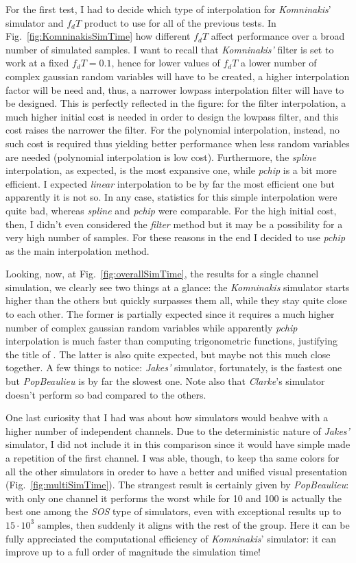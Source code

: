 For the first test, I had to decide which type of interpolation for \textit{Komninakis}' simulator and $f_dT$ product to use for all of the previous tests. In Fig.~\ref{fig:KomninakisSimTime} how different $f_dT$ affect performance over a broad number of simulated samples. I want to recall that \textit{Komninakis'} filter is set to work at a fixed $f_dT=0.1$, hence for lower values of $f_dT$ a lower number of complex gaussian random variables will have to be created, a higher interpolation factor will be need and, thus, a narrower lowpass interpolation filter will have to be designed. This is perfectly reflected in the figure: for the filter interpolation, a much higher initial cost is needed in order to design the lowpass filter, and this cost raises the narrower the filter. For the polynomial interpolation, instead, no such cost is required thus yielding better performance when less random variables are needed (polynomial interpolation is low cost). Furthermore, the \textit{spline} interpolation, as expected, is the most expansive one, while \textit{pchip} is a bit more efficient. I expected \textit{linear} interpolation to be by far the most efficient one but apparently it is not so. In any case, statistics for this simple interpolation were quite bad, whereas \textit{spline} and \textit{pchip} were comparable. For the high initial cost, then, I didn't even considered the \textit{filter} method but it may be a possibility for a very high number of samples. For these reasons in the end I decided to use \textit{pchip} as the main interpolation method.

Looking, now, at Fig.~\ref{fig:overallSimTime}, the results for a single channel simulation, we clearly see two things at a glance: the \textit{Komninakis} simulator starts higher than the others but quickly surpasses them all, while they stay quite close to each other. The former is partially expected since it requires a much higher number of complex gaussian random variables while apparently \textit{pchip} interpolation is much faster than computing trigonometric functions, justifying the title of \cite{A3}. The latter is also quite expected, but maybe not this much close together. A few things to notice: \textit{Jakes'} simulator, fortunately, is the fastest one but \textit{PopBeaulieu} is by far the slowest one. Note also that \textit{Clarke}'s simulator doesn't perform so bad compared to the others.

One last curiosity that I had was about how simulators would beahve with a higher number of independent channels. Due to the deterministic nature of \textit{Jakes'} simulator, I did not include it in this comparison since it would have simple made a repetition of the first channel. I was able, though, to keep tha same colors for all the other simulators in oreder to have a better and unified visual presentation (Fig.~\ref{fig:multiSimTime}). The strangest result is certainly given by \textit{PopBeaulieu}: with only one channel it performs the worst while for 10 and 100 is actually the best one among the \textit{SOS} type of simulators, even with exceptional results up to $15 \cdot 10^3$ samples, then suddenly it aligns with the rest of the group. Here it can be fully appreciated the computational efficiency of \textit{Komninakis}' simulator: it can improve up to a full order of magnitude the simulation time!